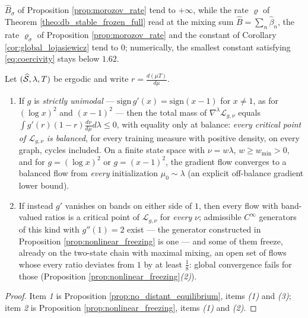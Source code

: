 \begin{remark}
$\widehat B_\sigma$ of Proposition \ref{prop:morozov_rate} tend to $+\infty$, while the rate $\varrho$ of Theorem \ref{theo:db_stable_frozen_full} read at the mixing sum $\widehat B=\sum_n\widehat\beta_n$, the rate $\varrho_\sigma$ of Proposition \ref{prop:morozov_rate} and the constant of Corollary \ref{cor:global_lojasiewicz} tend to $0$; numerically, the smallest constant satisfying \eqref{eq:coercivity} stays below $1.62$.
\end{remark}

\begin{theorem}\label{theo:global_dichotomy_full}
Let $(\widehat{\mathcal S},\lambda,T)$ be ergodic and write $r=\frac{d(\mu T)}{d\mu}$.
\begin{enumerate}
    \item If $g$ is \emph{strictly unimodal} --- $\mathrm{sign}\,g'(x)=\mathrm{sign}(x-1)$ for $x\neq1$, as for $(\log x)^2$ and $(x-1)^2$ --- then the total mass of $\nabla^{\lambda}\mathcal L_{g,\nu}$ equals $\int g'(r)(1-r)\frac{d\nu}{d\mu}d\lambda\leq0$, with equality only at balance: \emph{every critical point of $\mathcal L_{g,\nu}$ is balanced}, for every training measure with positive density, on every graph, cycles included. On a finite state space with $\nu=w\lambda$, $w\geq w_{\min}>0$, and for $g=(\log x)^2$ or $g=(x-1)^2$, the gradient flow converges to a balanced flow from \emph{every} initialization $\mu_0\sim\lambda$ (an explicit off-balance gradient lower bound).
    \item If instead $g'$ vanishes on bands on either side of $1$, then every flow with band-valued ratios is a critical point of $\mathcal L_{g,\nu}$ for \emph{every} $\nu$; admissible $C^\infty$ generators of this kind with $g''(1)=2$ exist --- the generator constructed in Proposition \ref{prop:nonlinear_freezing} is one --- and some of them freeze, already on the two-state chain with maximal mixing, an open set of flows whose every ratio deviates from $1$ by at least $\frac18$: global convergence fails for those (Proposition \ref{prop:nonlinear_freezing}\emph{(2)}).
\end{enumerate}
\end{theorem}

\begin{proof}
Item \emph{1} is Proposition \ref{prop:no_distant_equilibrium}, items \emph{(1)} and \emph{(3)}; item \emph{2} is Proposition \ref{prop:nonlinear_freezing}, items \emph{(1)} and \emph{(2)}.
\end{proof}

